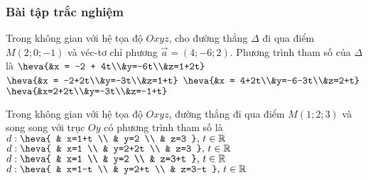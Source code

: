 \subsubsection{Bài tập trắc nghiệm}
	\begin{ex}%
	Trong không gian với hệ tọa độ $Oxyz$, cho đường thẳng $\Delta$ đi qua điểm $M(2; 0; -1)$ và véc-tơ chỉ phương $\overrightarrow{a} = (4; -6; 2)$. Phương trình tham số của $\Delta$ là
	\choice
	{$\heva{&x = -2 + 4t\\&y=-6t\\&z=1+2t}$}
	{$\heva{&x = -2+2t\\&y=-3t\\&z=1+t}$}
	{$\heva{&x = 4+2t\\&y=-6-3t\\&z=2+t}$}
	{\True $\heva{&x=2+2t\\&y=-3t\\&z=-1+t}$}
	\end{ex}
\begin{ex}%
	Trong không gian với hệ tọa độ $Oxyz$, đường thẳng đi qua điểm $M(1;2;3)$ và song song với trục $Oy$ có phương trình tham số là
	\choice
	{$d: \heva{
	& x=1+t \\ 
	& y=2 \\ 
	& z=3
	},\, t\in\mathbb{R}$} 
	{\True $d: \heva{
	& x=1 \\ 
	& y=2+2t \\ 
	& z=3
	},\, t\in\mathbb{R}$} 
	{$d: \heva{
	& x=1 \\ 
	& y=2 \\ 
	& z=3+t
	},\, t\in\mathbb{R}$} 
	{$d: \heva{
	& x=1-t \\ 
	& y=2+t \\ 
	& z=3-t
	} ,\, t\in\mathbb{R}$}
\end{ex}
